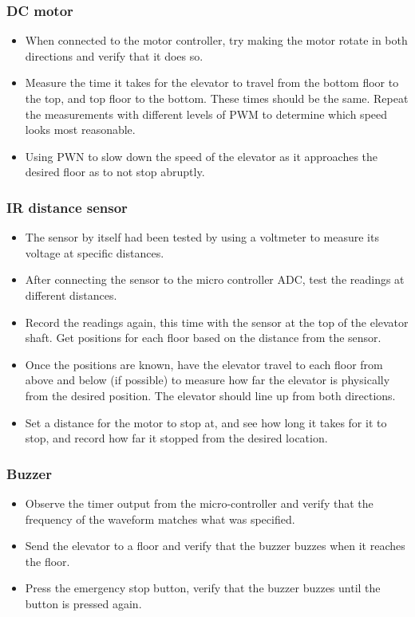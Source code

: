 \documentclass{article}
\begin{document}
	    \subsubsection{DC motor}
	    \begin{itemize}
            \item When connected to the motor controller, try making the motor rotate in both directions and verify that it does so.
            \item Measure the time it takes for the elevator to travel from the bottom floor to the top, and top floor to the bottom. These times should be the same. Repeat the measurements with different levels of PWM to determine which speed looks most reasonable.
            \item Using PWN to slow down the speed of the elevator as it approaches the desired floor as to not stop abruptly.  
        \end{itemize}
        
	    \subsubsection{IR distance sensor}
	    \begin{itemize}
	        \item The sensor by itself had been tested by using a voltmeter to measure its voltage at specific distances.
	        \item After connecting the sensor to the micro controller ADC, test the readings at different distances.
	        \item Record the readings again, this time with the sensor at the top of the elevator shaft. Get positions for each floor based on the distance from the sensor.
	        \item Once the positions are known, have the elevator travel to each floor from above and below (if possible) to measure how far the elevator is physically from the desired position. The elevator should line up from both directions.
	        \item Set a distance for the motor to stop at, and see how long it takes for it to stop, and record how far it stopped from the desired location.
	    \end{itemize}
	    
	    \subsubsection{Buzzer}
	    \begin{itemize}
	        \item Observe the timer output from the micro-controller and verify that the frequency of the waveform matches what was specified.
	        \item Send the elevator to a floor and verify that the buzzer buzzes when it reaches the floor.
	        \item Press the emergency stop button, verify that the buzzer buzzes until the button is pressed again.
	    \end{itemize}
	    
\end{document}

